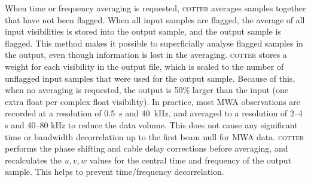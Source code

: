 \documentclass{pasa}
\begin{document}
When time or frequency averaging is requested, \textsc{cotter} averages samples together that have not been flagged. When all input samples are flagged, the average of all input visibilities is stored into the output sample, and the output sample is flagged. This method makes it possible to superficially analyse flagged samples in the output, even though information is lost in the averaging. \textsc{cotter} stores a weight for each visibility in the output file, which is scaled to the number of unflagged input samples that were used for the output sample. Because of this, when no averaging is requested, the output is 50\% larger than the input (one extra float per complex float visibility). In practice, most MWA observations are recorded at a resolution of 0.5~s and 40~kHz, and averaged to a resolution of 2--4 s and 40--80 kHz to reduce the data volume. This does not cause any significant time or bandwidth decorrelation up to the first beam null for MWA data. \textsc{cotter} performs the phase shifting and cable delay corrections before averaging, and recalculates the $u,v,w$ values for the central time and frequency of the output sample. This helps to prevent time/frequency decorrelation.
\end{document}
